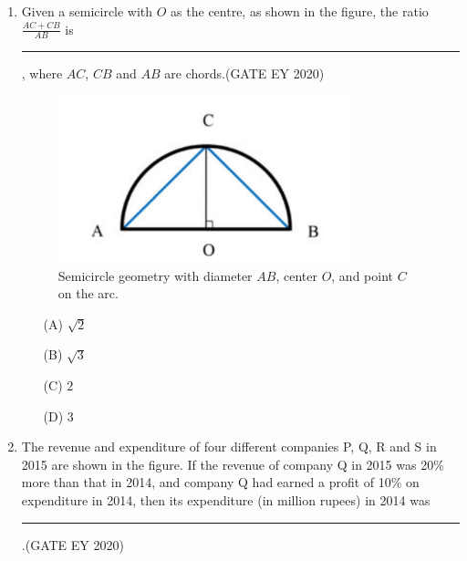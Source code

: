 \begin{enumerate}
\item Given a semicircle with $O$ as the centre, as shown in the figure, the ratio $\frac{AC+CB}{AB}$ is \rule{2cm}{0.15mm}, where $AC$, $CB$ and $AB$ are chords.\hfill {(GATE EY 2020)}
\begin{center}
\begin{figure}[H]
    \centering
    \includegraphics[width=0.8\textwidth]{figs/fig1.png}
    \caption{Semicircle geometry with diameter $AB$, center $O$, and point $C$ on the arc.}
    \label{fig:semicircle-geometry}
\end{figure}
\end{center}
\begin{itemize}
    \item[(A)] $\sqrt{2}$
    \item[(B)] $\sqrt{3}$
    \item[(C)] $2$
    \item[(D)] $3$
\end{itemize}

\item The revenue and expenditure of four different companies P, Q, R and S in 2015 are shown in the figure. If the revenue of company Q in 2015 was 20\% more than that in 2014, and company Q had earned a profit of 10\% on expenditure in 2014, then its expenditure (in million rupees) in 2014 was \rule{2cm}{0.15mm}.\hfill {(GATE EY 2020)}


\end{enumerate}
